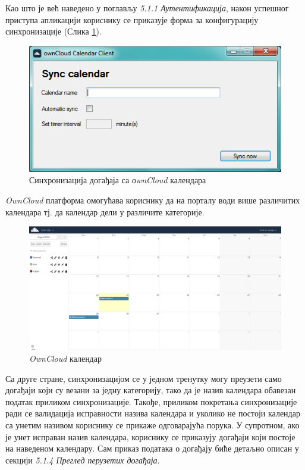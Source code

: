 Као што је већ наведено у поглављу \textit{5.1.1 Аутентификација}, након успешног приступа апликацији кориснику се приказује форма за конфигурацију синхронизације (Слика \ref{fig:sync_calendar}).

\begin{figure}[H]
	\centering
	\includegraphics[scale=0.5]{slike/SyncCalendar.png}
	\caption{Синхронизација догађаја са \textit{оwnCloud} календара}
	\label{fig:sync_calendar}
\end{figure}

\textit{OwnCloud} платформа омогућава кориснику да на порталу води више различитих календара тј. да календар дели у различите категорије. 

\begin{figure}[H]
	\centering
	\includegraphics[scale=0.4]{slike/ownCloudCalendar.png}
	\caption{\textit{OwnCloud} календар}
	\label{fig:own_cloud_calendar}
\end{figure}

Са друге стране, синхронизацијом се у једном тренутку могу преузети само догађаји који су везани за једну категорију, тако да је назив календара обавезан податак приликом синхронизације. Такође, приликом покретања синхронизације ради се валидација исправности назива календара и уколико не постоји календар са унетим називом кориснику се прикаже одговарајућа порука. У супротном, ако је унет исправан назив календара, кориснику се приказују догађаји који постоје на наведеном календару. Сам приказ података о догађају биће детаљно описан у секцији \textit{5.1.4 Преглед перузетих догађаја}.

